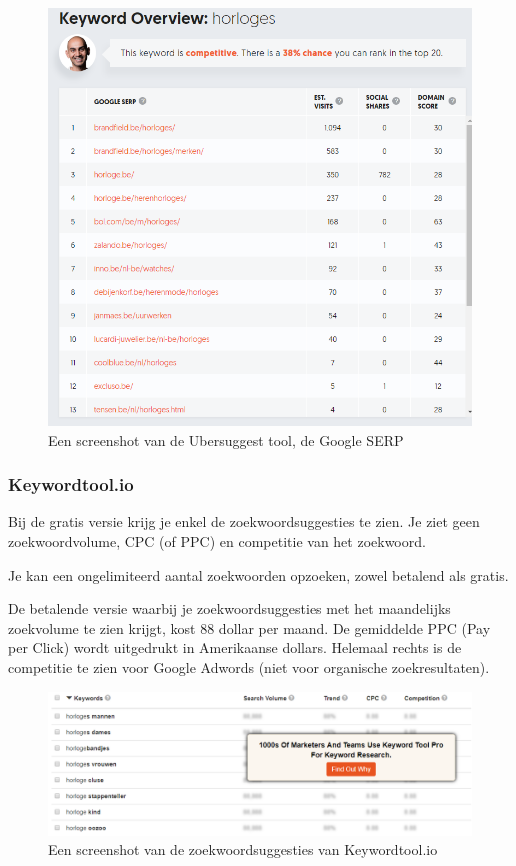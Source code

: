 \begin{figure}[h!]
\centering
\includegraphics[width=\linewidth]{Bachelorproef/bachelor/img/ubersrechts.PNG}
\caption{Een screenshot van de Ubersuggest tool, de Google SERP \autocite{ubersuggest}}
\end{figure}

\subsubsection{Keywordtool.io}
\label{ch: Keywordtool.io}

Bij de gratis versie krijg je enkel de zoekwoordsuggesties te zien. Je ziet geen zoekwoordvolume, CPC (of PPC) en competitie van het zoekwoord. 

Je kan een ongelimiteerd aantal zoekwoorden opzoeken, zowel betalend als gratis. 

De betalende versie waarbij je zoekwoordsuggesties met het maandelijks zoekvolume te zien krijgt, kost 88 dollar per maand. De gemiddelde PPC (Pay per Click) wordt uitgedrukt in Amerikaanse dollars. Helemaal rechts is de competitie te zien voor Google Adwords (niet voor organische zoekresultaten). 

\begin{figure}[h!]
\centering
\includegraphics[width=\linewidth]{Bachelorproef/bachelor/img/keywordtoolio.PNG}
\caption{Een screenshot van de zoekwoordsuggesties van Keywordtool.io \autocite{keywordtoolio}}
\end{figure}


